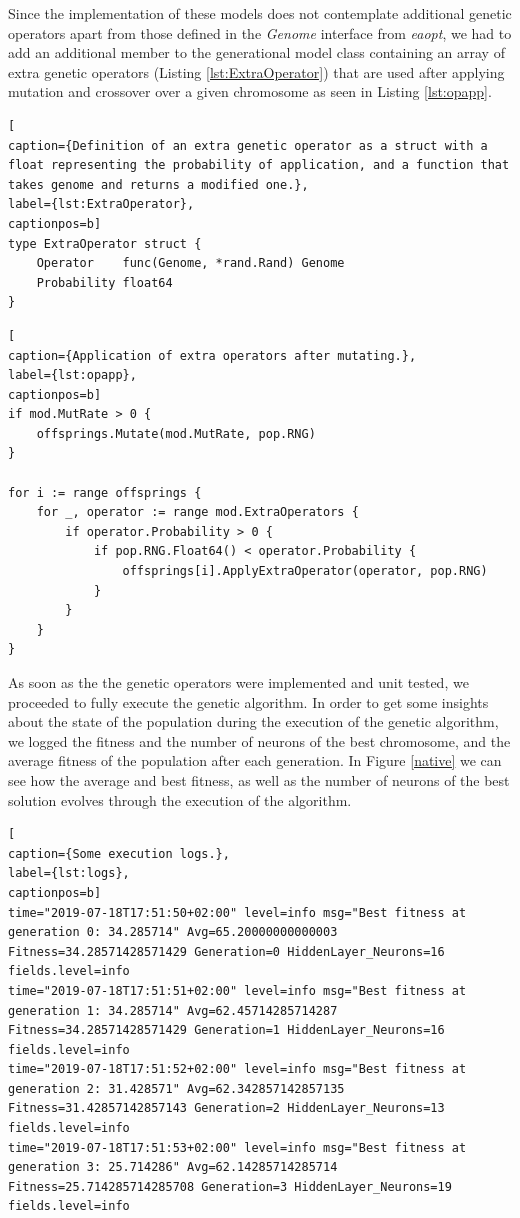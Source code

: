 Since the implementation of these models does not contemplate additional genetic operators apart from those defined in the \textit{Genome} interface from \textit{eaopt}, we had to add an additional member to the generational model class containing an array of extra genetic operators (Listing \ref{lst:ExtraOperator}) that are used after applying mutation and crossover over a given chromosome as seen in Listing \ref{lst:opapp}.

\begin{lstlisting}[
caption={Definition of an extra genetic operator as a struct with a float representing the probability of application, and a function that takes genome and returns a modified one.},
label={lst:ExtraOperator},
captionpos=b]
type ExtraOperator struct {
	Operator    func(Genome, *rand.Rand) Genome
	Probability float64
}
\end{lstlisting}

\begin{lstlisting}[
caption={Application of extra operators after mutating.},
label={lst:opapp},
captionpos=b]
if mod.MutRate > 0 {
	offsprings.Mutate(mod.MutRate, pop.RNG)
}

for i := range offsprings {
	for _, operator := range mod.ExtraOperators {
		if operator.Probability > 0 {
			if pop.RNG.Float64() < operator.Probability {
				offsprings[i].ApplyExtraOperator(operator, pop.RNG)
			}
		}
	}
}
\end{lstlisting} 

As soon as the the genetic operators were implemented and unit tested, we proceeded to fully execute the genetic algorithm.
In order to get some insights about the state of the population during the execution of the genetic algorithm, we logged the fitness and the number of neurons of the best chromosome, and the average fitness of the population after each generation. In Figure \ref{native} we can see how the average and best fitness, as well as the number of neurons of the best solution evolves through the execution of the algorithm.

\begin{lstlisting}[
caption={Some execution logs.},
label={lst:logs},
captionpos=b]
time="2019-07-18T17:51:50+02:00" level=info msg="Best fitness at generation 0: 34.285714" Avg=65.20000000000003 Fitness=34.28571428571429 Generation=0 HiddenLayer_Neurons=16 fields.level=info
time="2019-07-18T17:51:51+02:00" level=info msg="Best fitness at generation 1: 34.285714" Avg=62.45714285714287 Fitness=34.28571428571429 Generation=1 HiddenLayer_Neurons=16 fields.level=info
time="2019-07-18T17:51:52+02:00" level=info msg="Best fitness at generation 2: 31.428571" Avg=62.342857142857135 Fitness=31.42857142857143 Generation=2 HiddenLayer_Neurons=13 fields.level=info
time="2019-07-18T17:51:53+02:00" level=info msg="Best fitness at generation 3: 25.714286" Avg=62.14285714285714 Fitness=25.714285714285708 Generation=3 HiddenLayer_Neurons=19 fields.level=info
\end{lstlisting} 

